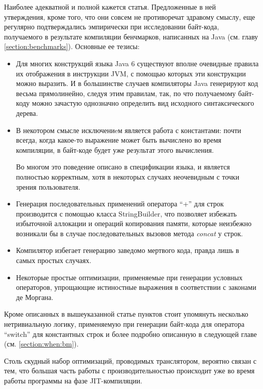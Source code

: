 Наиболее адекватной и полной кажется статья\cite{JavacOT}.
Предложенные в ней утверждения, кроме того, что они совсем не противоречат здравому смыслу,
еще регулярно подтверждались эмпирически при исследовании байт-кода, получаемого в результате
компиляции бенчмарков, написанных на Java (см. главу \ref{section:benchmarks}).
Основные ее тезисы:
\begin{itemize}
    \item Для многих конструкций языка Java 6 существуют вполне очевидные правила их отображения
    в инструкции JVM, с помощью которых эти конструкции можно выразить.
    И в большинстве случаев компиляторы Java генерируют код весьма прямолинейно, следуя этим
    правилам, так, по что получаемому байт-коду можно зачастую однозначно определить вид исходного
    синтаксического дерева.
    \item В некотором смысле исключениeм является работа с константами:
    почти всегда, когда какое-то выражение может быть вычислено во время компиляции, в байт-коде
    будет уже результат этого вычисления.

    Во многом это поведение описано в спецификации языка, и является полностью корректным,
    хотя в некоторых случаях неочевидным с точки зрения пользователя.

    \item Генерация последовательных применений оператора ``+'' для строк производится с помощью
    класса StringBuilder, что позволяет избежать избыточной аллокации и операций копирования памяти,
    которые неизбежно возникали бы в случае последовательных вызовов метода \textit{concat} у строк.

    \item Компилятор избегает генерацию заведомо мертвого кода, правда лишь в самых простых случаях.

    \item Некоторые простые оптимизации, применяемые при генерации условных операторов, упрощающие
    истиностные выражения в соответствии с законами де Моргана.
\end{itemize}

Кроме описанных в вышеуказанной статье пунктов стоит упомянуть несколько нетривиальную логику,
применяемую при генерации байт-кода для оператора ``switch'' для константных строк и более подробно
описанную в следующей главе (см. \ref{section:when:bm}).

Столь скудный набор оптимизаций, проводимых транслятором, вероятно связан с тем, что большая часть
работы с производительностью происходит уже во время работы программы на фазе JIT-компиляции.

